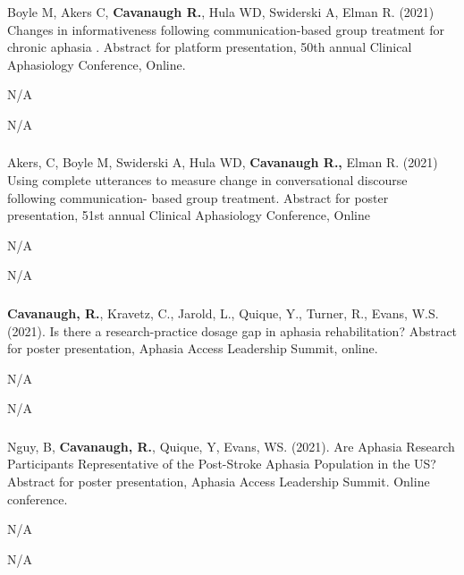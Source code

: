 \documentclass[
]{article}
\begin{document}
Boyle M, Akers C, \textbf{Cavanaugh R.}, Hula WD, Swiderski A, Elman R.
(2021) Changes in informativeness following communication-based group
treatment for chronic aphasia . Abstract for platform presentation, 50th
annual Clinical Aphasiology Conference, Online.

N/A

N/A

\hypertarget{section-13}{%
\subsubsection{}\label{section-13}}

Akers, C, Boyle M, Swiderski A, Hula WD, \textbf{Cavanaugh R.,} Elman R.
(2021) Using complete utterances to measure change in conversational
discourse following communication- based group treatment. Abstract for
poster presentation, 51st annual Clinical Aphasiology Conference, Online

N/A

N/A

\hypertarget{section-14}{%
\subsubsection{}\label{section-14}}

\textbf{Cavanaugh, R.}, Kravetz, C., Jarold, L., Quique, Y., Turner, R.,
Evans, W.S. (2021). Is there a research-practice dosage gap in aphasia
rehabilitation? Abstract for poster presentation, Aphasia Access
Leadership Summit, online.

N/A

N/A

\hypertarget{section-15}{%
\subsubsection{}\label{section-15}}

Nguy, B, \textbf{Cavanaugh, R.}, Quique, Y, Evans, WS. (2021). Are
Aphasia Research Participants Representative of the Post-Stroke Aphasia
Population in the US? Abstract for poster presentation, Aphasia Access
Leadership Summit. Online conference.

N/A

N/A

\hypertarget{section-16}{%
\subsubsection{}\label{section-16}}
\end{document}
